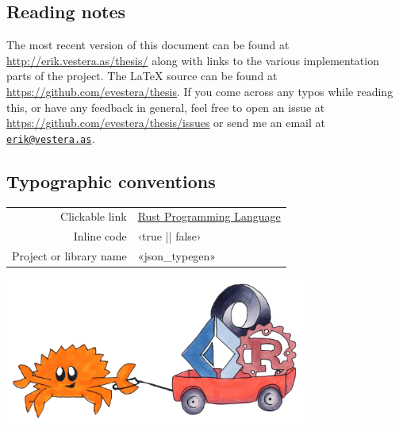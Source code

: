
\vspace*{2cm}
\thispagestyle{plain}

\begin{center}

\section*{\hfil Reading notes \hfil}

\end{center}

The most recent version of this document can be found at \url{http://erik.vestera.as/thesis/} along with links to the various implementation parts of the project. The LaTeX source can be found at \url{https://github.com/evestera/thesis}. If you come across any typos while reading this, or have any feedback in general, feel free to open an issue at \url{https://github.com/evestera/thesis/issues} or send me an email at \href{mailto:erik@vestera.as}{\nolinkurl{erik@vestera.as}}.

\begin{center}

\subsection*{\hfil Typographic conventions \hfil}

\begin{tabular}{ r l }
Clickable link & \href{https://www.rust-lang.org/}{Rust Programming Language} \\
Inline code & ‹true || false› \\
Project or library name & «json_typegen» \\
\end{tabular}

\vspace*{1cm}
\includegraphics[width=10cm, angle=0, trim=10 10 10 10, clip]{ferris/cart2}

\end{center}
